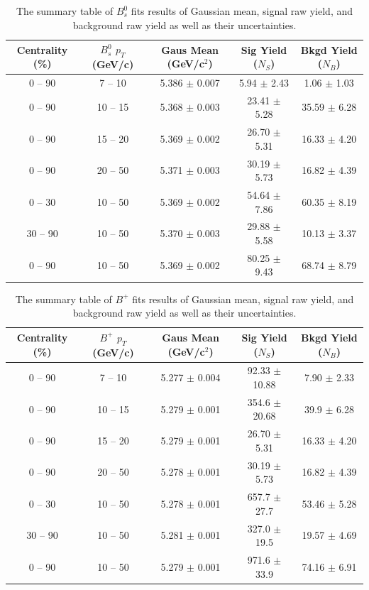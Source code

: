 \begin{table}[h]
\begin{center}
\caption{The summary table of $B^0_s$ fits results of Gaussian mean, signal raw yield, and background raw yield as well as their uncertainties.}
\vspace{1em}
\label{BsRawYield}
  \begin{tabular}{ |c|c|c|c|c|}
    \hline 
Centrality (\%) & $B^0_s$ $p_T$ (GeV/c) & Gaus Mean (GeV/c$^2$) & Sig Yield ($N_S$) & Bkgd Yield ($N_B$) \\
     \hline
0 -- 90 & 7 -- 10 & 5.386 $\pm$ 0.007 & 5.94 $\pm$ 2.43 & 1.06 $\pm$ 1.03 \\
0 -- 90 & 10 -- 15 & 5.368 $\pm$ 0.003 & 23.41 $\pm$ 5.28 & 35.59 $\pm$ 6.28 \\
0 -- 90 & 15 -- 20 & 5.369 $\pm$ 0.002 & 26.70 $\pm$ 5.31 & 16.33 $\pm$ 4.20 \\
0 -- 90 & 20 -- 50 & 5.371 $\pm$ 0.003 & 30.19 $\pm$ 5.73 & 16.82 $\pm$ 4.39 \\
0 -- 30 & 10 -- 50 & 5.369 $\pm$ 0.002 & 54.64 $\pm$ 7.86 & 60.35 $\pm$ 8.19 \\
30 -- 90 & 10 -- 50 & 5.370 $\pm$ 0.003 & 29.88 $\pm$ 5.58 & 10.13 $\pm$ 3.37 \\
0 -- 90 & 10 -- 50 & 5.369 $\pm$ 0.002 & 80.25 $\pm$ 9.43 & 68.74 $\pm$ 8.79 \\
     \hline
    \hline
\end{tabular}
\end{center}
\end{table}


\begin{table}[h]
\begin{center}
\caption{The summary table of $B^+$ fits results of Gaussian mean, signal raw yield, and background raw yield as well as their uncertainties.}
\vspace{1em}
\label{BPRawYield}
  \begin{tabular}{ |c|c|c|c|c|}
    \hline 
Centrality (\%) & $B^+$ $p_T$ (GeV/c) & Gaus Mean (GeV/c$^2$) & Sig Yield ($N_S$) & Bkgd Yield ($N_B$) \\
     \hline
0 -- 90 & 7 -- 10 & 5.277 $\pm$ 0.004 & 92.33 $\pm$ 10.88 & 7.90 $\pm$ 2.33 \\
0 -- 90 & 10 -- 15 & 5.279 $\pm$ 0.001 & 354.6 $\pm$ 20.68 & 39.9 $\pm$ 6.28 \\
0 -- 90 & 15 -- 20 & 5.279 $\pm$ 0.001 & 26.70 $\pm$ 5.31 & 16.33 $\pm$ 4.20 \\
0 -- 90 & 20 -- 50 & 5.278 $\pm$ 0.001 & 30.19 $\pm$ 5.73 & 16.82 $\pm$ 4.39 \\
0 -- 30 & 10 -- 50 & 5.278 $\pm$ 0.001 & 657.7 $\pm$ 27.7 & 53.46 $\pm$ 5.28 \\
30 -- 90 & 10 -- 50 & 5.281 $\pm$ 0.001 & 327.0 $\pm$ 19.5 & 19.57 $\pm$ 4.69 \\
0 -- 90 & 10 -- 50 & 5.279 $\pm$ 0.001 & 971.6 $\pm$ 33.9 & 74.16 $\pm$ 6.91 \\
     \hline
 \end{tabular}
\end{center}
\end{table}

